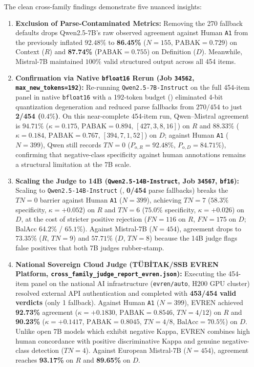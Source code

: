 \documentclass[a4paper,12pt]{report}
\begin{document}
The clean cross-family findings demonstrate five nuanced insights:
\begin{sloppypar}
\begin{enumerate}
    \item \textbf{Exclusion of Parse-Contaminated Metrics:} Removing the 270 fallback defaults drops Qwen2.5-7B's raw observed agreement against Human \texttt{A1} from the previously inflated $92.48\%$ to \textbf{86.45\%} ($N=155$, $\text{PABAK}=0.729$) on Context ($R$) and \textbf{87.74\%} ($\text{PABAK}=0.755$) on Definition ($D$). Meanwhile, Mistral-7B maintained $100\%$ valid structured output across all 454 items.
    \item \textbf{Confirmation via Native \texttt{bfloat16} Rerun (Job \texttt{34562}, \texttt{max\_new\_tokens=192}):} Re-running \texttt{Qwen2.5-7B-Instruct} on the full 454-item panel in native \texttt{bfloat16} with a 192-token budget () eliminated 4-bit quantization degeneration and reduced parse fallbacks from $270/454$ to just \textbf{2/454 ($0.4\%$)}. On this near-complete 454-item run, Qwen--Mistral agreement is $94.71\%$ ($\kappa=0.175$, $\text{PABAK}=0.894$, $[427,3,8,16]$) on $R$ and $88.33\%$ ($\kappa=0.184$, $\text{PABAK}=0.767$, $[394,7,1,52]$) on $D$; against Human \texttt{A1} ($N=399$), Qwen still records $TN=0$ ($P_{o,R}=92.48\%$, $P_{o,D}=84.71\%$), confirming that negative-class specificity against human annotations remains a structural limitation at the 7B scale.
    \item \textbf{Scaling the Judge to 14B (\texttt{Qwen2.5-14B-Instruct}, Job \texttt{34567}, \texttt{bf16}):} Scaling to \texttt{Qwen2.5-14B-Instruct} (, \textbf{0/454} parse fallbacks) breaks the $TN=0$ barrier against Human \texttt{A1} ($N=399$), achieving $TN=7$ ($58.3\%$ specificity, $\kappa=+0.052$) on $R$ and $TN=6$ ($75.0\%$ specificity, $\kappa=+0.026$) on $D$, at the cost of stricter positive rejection ($FN=116$ on $R$, $FN=175$ on $D$; BalAcc $64.2\%$ / $65.1\%$). Against Mistral-7B ($N=454$), agreement drops to $73.35\%$ ($R$, $TN=9$) and $57.71\%$ ($D$, $TN=8$) because the 14B judge flags false positives that both 7B judges rubber-stamp.
    \item \textbf{National Sovereign Cloud Judge (TÜBİTAK/SSB EVREN Platform, \texttt{cross\_family\_judge\_report\_evren.json}):} Executing the 454-item panel on the national AI infrastructure (\texttt{evren/auto}, H200 GPU cluster) resolved external API authentication and completed with \textbf{453/454 valid verdicts} (only 1 fallback). Against Human \texttt{A1} ($N=399$), EVREN achieved \textbf{92.73\%} agreement ($\kappa = +0.1830$, $\text{PABAK}=0.8546$, $TN=4/12$) on $R$ and \textbf{90.23\%} ($\kappa = +0.1417$, $\text{PABAK}=0.8045$, $TN=4/8$, $\text{BalAcc}=70.5\%$) on $D$. Unlike open 7B models which exhibit negative Kappa, EVREN combines high human concordance with positive discriminative Kappa and genuine negative-class detection ($TN=4$). Against European Mistral-7B ($N=454$), agreement reaches \textbf{93.17\%} on $R$ and \textbf{89.65\%} on $D$.

\end{enumerate}
\end{sloppypar}
\end{document}
